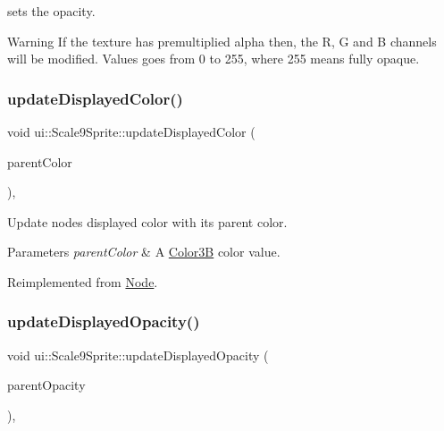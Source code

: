 sets the opacity. \begin{DoxyWarning}{Warning}
If the texture has premultiplied alpha then, the R, G and B channels will be modified. Values goes from 0 to 255, where 255 means fully opaque. 
\end{DoxyWarning}
\mbox{\label{classui_1_1Scale9Sprite_a130c78092b506d4b06fec469e80c554c}} 
\subsubsection{\texorpdfstring{update\+Displayed\+Color()}{updateDisplayedColor()}}
{\footnotesize\ttfamily void ui\+::\+Scale9\+Sprite\+::update\+Displayed\+Color (\begin{DoxyParamCaption}\item[{const \hyperlink{structColor3B}{Color3B} \&}]{parent\+Color }\end{DoxyParamCaption})\hspace{0.3cm}{\ttfamily [override]}, {\ttfamily [virtual]}}

Update node\textquotesingle{}s displayed color with its parent color. 
\begin{DoxyParams}{Parameters}
{\em parent\+Color} & A \hyperlink{structColor3B}{Color3B} color value. \\
\hline
\end{DoxyParams}


Reimplemented from \hyperlink{classNode_ac733bae7b9590f8da746cbc3d1337a2f}{Node}.

\mbox{\label{classui_1_1Scale9Sprite_a85bca0738c6bff049fe0a962d285bda4}} 
\subsubsection{\texorpdfstring{update\+Displayed\+Opacity()}{updateDisplayedOpacity()}}
{\footnotesize\ttfamily void ui\+::\+Scale9\+Sprite\+::update\+Displayed\+Opacity (\begin{DoxyParamCaption}\item[{G\+Lubyte}]{parent\+Opacity }\end{DoxyParamCaption})\hspace{0.3cm}{\ttfamily [override]}, {\ttfamily [virtual]}}

